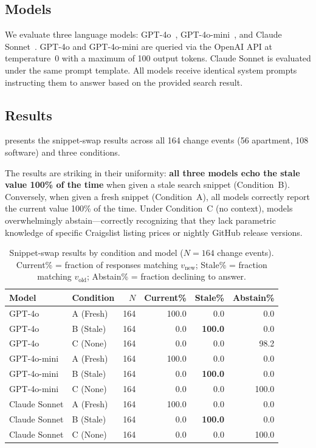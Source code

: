 \subsection{Models}

We evaluate three language models: GPT-4o~\citep{openai2024gpt4o},
GPT-4o-mini~\citep{openai2024gpt4o}, and
Claude Sonnet~\citep{anthropic2024claude}.
GPT-4o and GPT-4o-mini are queried via the OpenAI API at temperature~0 with a
maximum of 100 output tokens. Claude Sonnet is evaluated under the same prompt
template. All models receive identical system prompts instructing them to answer
based on the provided search result.

\subsection{Results}

 presents the snippet-swap results across all 164 change
events (56 apartment, 108 software) and three conditions.

The results are striking in their uniformity: \textbf{all three models echo the
stale value 100\% of the time} when given a stale search snippet (Condition~B).
Conversely, when given a fresh snippet (Condition~A), all models correctly report
the current value 100\% of the time. Under Condition~C (no context), models
overwhelmingly abstain---correctly recognizing that they lack parametric knowledge
of specific Craigslist listing prices or nightly GitHub release versions.

\begin{table}[t]
  \centering
  \caption{Snippet-swap results by condition and model ($N = 164$ change events).
           Current\% = fraction of responses matching $v_{\text{new}}$;
           Stale\% = fraction matching $v_{\text{old}}$;
           Abstain\% = fraction declining to answer.}
  \label{tab:snippet_swap}
  \begin{tabular}{llrrrr}
    \toprule
    Model & Condition & $N$ & Current\% & Stale\% & Abstain\% \\
    \midrule
    GPT-4o      & A (Fresh) & 164 & 100.0 & 0.0 & 0.0 \\
    GPT-4o      & B (Stale) & 164 & 0.0 & \textbf{100.0} & 0.0 \\
    GPT-4o      & C (None)  & 164 & 0.0 & 0.0 & 98.2 \\
    \midrule
    GPT-4o-mini & A (Fresh) & 164 & 100.0 & 0.0 & 0.0 \\
    GPT-4o-mini & B (Stale) & 164 & 0.0 & \textbf{100.0} & 0.0 \\
    GPT-4o-mini & C (None)  & 164 & 0.0 & 0.0 & 100.0 \\
    \midrule
    Claude Sonnet & A (Fresh) & 164 & 100.0 & 0.0 & 0.0 \\
    Claude Sonnet & B (Stale) & 164 & 0.0 & \textbf{100.0} & 0.0 \\
    Claude Sonnet & C (None)  & 164 & 0.0 & 0.0 & 100.0 \\
    \bottomrule
  \end{tabular}
\end{table}

